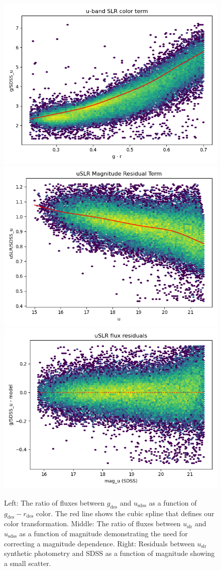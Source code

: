 \begin{figure}
    \includegraphics[width=0.32\linewidth]{./figures/u-band/uslr/transformed_to_SDSS_band_g_slr.png}
    \includegraphics[width=0.32\linewidth]{./figures/u-band/uslr/transformed_to_SDSS_band_g_slr_mag_offset.png}
    \includegraphics[width=0.32\linewidth]{./figures/u-band/uslr/transformed_to_SDSS_band_g_slr_flux_residuals.png}
    \label{fig:slr_spline}
    \caption{
    Left: The ratio of fluxes between $g_{\mathrm{des}}$ and $u_{\mathrm{sdss}}$ as a function of $g_{\mathrm{des}}-r_{\mathrm{des}}$ color. The red line shows the cubic spline that defines our color transformation.
    Middle: The ratio of fluxes between $u_{\mathrm{slr}}$ and $u_{\mathrm{sdss}}$ as a function of magnitude demonstrating the need for correcting a magnitude dependence. 
    Right: Residuals between $u_{\mathrm{slr}}$ synthetic photometry and SDSS as a function of magnitude showing a small scatter.}
\end{figure}

